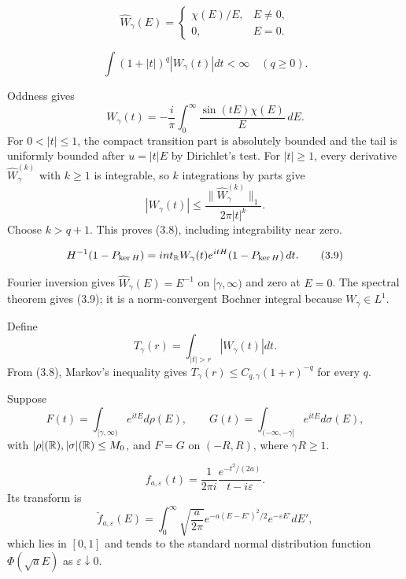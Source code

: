 \documentclass[11pt,a4paper]{article}
\begin{document}

\[
 \widehat W_\gamma(E)=\begin{cases}\chi(E)/E,&E\ne0,\\0,&E=0.\end{cases} \tag{3.7}
\]

\[
 \int(1+|t|)^q|W_\gamma(t)|dt<\infty\quad(q\geq0).                 \tag{3.8}
\]

\Because Oddness gives
\[
 W_\gamma(t)=-\frac{i}{\pi}\int_0^\infty\frac{\sin(tE)\chi(E)}E\,dE.
\]
For $0<|t|\leq1$, the compact transition part is absolutely bounded and the tail is
uniformly bounded after $u=|t|E$ by Dirichlet's test.  For $|t|\geq1$, every
derivative $\widehat W_\gamma^{(k)}$ with $k\geq1$ is integrable, so $k$
integrations by parts give
\[
 |W_\gamma(t)|\leq\frac{\|\widehat W_\gamma^{(k)}\|_1}{2\pi|t|^k}.
\]
Choose $k>q+1$.  This proves (3.8), including integrability near zero.

\[
 H^{-1}(1-P_{\ker H})=int_\mathbb R W_\gamma(t)e^{itH}(1-P_{\ker H})\,dt. \tag{3.9}
\]

\Because Fourier inversion gives $\widehat W_\gamma(E)=E^{-1}$ on
$[\gamma,\infty)$ and zero at $E=0$.  The spectral theorem gives (3.9); it is a
norm-convergent Bochner integral because $W_\gamma\in L^1$.

Define
\[
 T_\gamma(r)=\int_{|t|>r}|W_\gamma(t)|dt.
\]
From (3.8), Markov's inequality gives
$T_\gamma(r)\leq C_{q,\gamma}(1+r)^{-q}$ for every $q$.

\QedStep


Suppose
\[
 F(t)=\int_{[\gamma,\infty)}e^{itE}d\rho(E),\qquad
 G(t)=\int_{(-\infty,-\gamma]}e^{itE}d\sigma(E),
\]
with $|\rho|(\mathbb R),|\sigma|(\mathbb R)\leq M_0$, and $F=G$ on $(-R,R)$, where
$\gamma R\geq1$.

\[
 f_{a,\varepsilon}(t)=\frac{1}{2\pi i}
 \frac{e^{-t^2/(2a)}}{t-i\varepsilon}.
\]
Its transform is
\[
 \check f_{a,\varepsilon}(E)=
 \int_0^\infty\sqrt{\frac a{2\pi}}
 e^{-a(E-E')^2/2}e^{-\varepsilon E'}dE',                           \tag{3.10}
\]
which lies in $[0,1]$ and tends to the standard normal distribution function
$\Phi(\sqrt aE)$ as $\varepsilon\downarrow0$.
\end{document}
